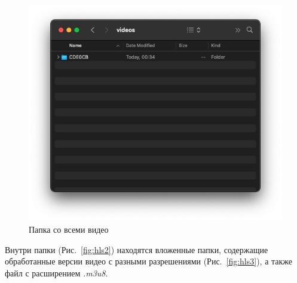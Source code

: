 \documentclass{../../includes/TechDoc}
\begin{document}
    \begin{figure}[h]
        \centering
        \includegraphics[width=0.7\linewidth]{../images/hls1.png}
        \caption{Папка со всеми видео}
        \label{fig:hls1}
    \end{figure}

    Внутри папки (Рис.~\ref{fig:hls2}) находятся вложенные папки, содержащие обработанные версии видео с разными разрешениями (Рис.~\ref{fig:hls3}), а также файл с расширением \emph{.m3u8}.
\end{document}
